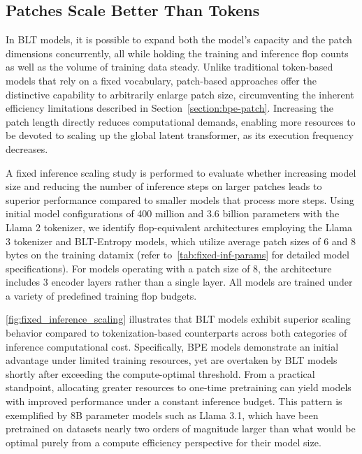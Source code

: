 \subsection{Patches Scale Better Than Tokens} In {\textsc BLT} models, it is possible to expand both the model's capacity and the patch dimensions concurrently, all while holding the training and inference flop counts as well as the volume of training data steady. Unlike traditional token-based models that rely on a fixed vocabulary, patch-based approaches offer the distinctive capability to arbitrarily enlarge patch size, circumventing the inherent efficiency limitations described in Section~\ref{section:bpe-patch}. Increasing the patch length directly reduces computational demands, enabling more resources to be devoted to scaling up the global latent transformer, as its execution frequency decreases.

A fixed inference scaling study is performed to evaluate whether increasing model size and reducing the number of inference steps on larger patches leads to superior performance compared to smaller models that process more steps. Using initial model configurations of 400 million and 3.6 billion parameters with the Llama 2 tokenizer, we identify flop-equivalent architectures employing the Llama 3 tokenizer and {\textsc BLT}-Entropy models, which utilize average patch sizes of 6 and 8 bytes on the training datamix (refer to~\autoref{tab:fixed-inf-params} for detailed model specifications). For models operating with a patch size of 8, the architecture includes 3 encoder layers rather than a single layer. All models are trained under a variety of predefined training flop budgets.

\autoref{fig:fixed_inference_scaling} illustrates that {\textsc BLT} models exhibit superior scaling behavior compared to tokenization-based counterparts across both categories of inference computational cost. Specifically, BPE models demonstrate an initial advantage under limited training resources, yet are overtaken by {\textsc BLT} models shortly after exceeding the compute-optimal threshold. From a practical standpoint, allocating greater resources to one-time pretraining can yield models with improved performance under a constant inference budget. This pattern is exemplified by 8B parameter models such as Llama 3.1, which have been pretrained on datasets nearly two orders of magnitude larger than what would be optimal purely from a compute efficiency perspective for their model size.

